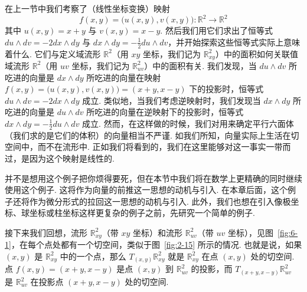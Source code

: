 在上一节中我们考察了（线性坐标变换）映射
\[
f(x,y)=\bigl(u(x,y),v(x,y)\bigr):\mathbb{R}^2\to\mathbb{R}^2
\]
其中 $u(x,y)=x+y$ 与 $v(x,y)=x-y$. 然后我们用它们求出了恒等式 $du\wedge dv=-2dx\wedge dy$ 与 $dx\wedge dy=-\frac12du\wedge dv$，并开始探索这些恒等式实际上意味着什么. 它们与定义域流形 $\mathbb{R}^2$（用 $xy$ 坐标，我们记为 $\mathbb{R}^2_{xy}$）中的面积如何关联值域流形 $\mathbb{R}^2$（用 $uv$ 坐标，我们记为 $\mathbb{R}^2_{uv}$）中的面积有关. 我们发现，当 $du\wedge dv$ 所吃进的向量是 $dx\wedge dy$ 所吃进的向量在映射 $f(x,y)=\bigl(u(x,y),v(x,y)\bigr)=(x+y,x-y)$ 下的投影时，恒等式 $du\wedge dv=-2dx\wedge dy$ 成立. 类似地，当我们考虑逆映射时，我们发现当 $dx\wedge dy$ 所吃进的向量是 $du\wedge dv$ 所吃进的向量在逆映射下的投影时，恒等式 $dx\wedge dy=-\frac12du\wedge dv$ 成立. 然而，在这样做的时候，我们对用来确定平行六面体（我们求的是它们的体积）的向量相当不严谨. 如我们所知，向量实际上生活在切空间中，而不在流形中. 正如我们将看到的，我们在这里能够对这一事实一带而过，是因为这个映射是线性的.

并不是想用这个例子把你烦得要死，但在本节中我们将在数学上更精确的同时继续使用这个例子. 这将作为向量的前推这一思想的动机与引入. 在本章后面，这个例子还将作为微分形式的拉回这一思想的动机与引入. 此外，我们也想在引入像极坐标、球坐标或柱坐标这样更复杂的例子之前，先研究一个简单的例子.

接下来我们回想，流形 $\mathbb{R}^2_{xy}$（带 $xy$ 坐标）和流形 $\mathbb{R}^2_{uv}$（带 $uv$ 坐标），见图~\ref{fig:6-1}，在每个点处都有一个切空间，类似于图~\ref{fig:2-15} 所示的情况. 也就是说，如果 $(x,y)$ 是 $\mathbb{R}^2_{xy}$ 中的一个点，那么 $T_{(x,y)}\mathbb{R}^2_{xy}$ 就是 $\mathbb{R}^2_{xy}$ 在点 $(x,y)$ 处的切空间. 点 $f(x,y)=(x+y,x-y)$ 是点 $(x,y)$ 到 $\mathbb{R}^2_{uv}$ 的投影，而 $T_{(x+y,x-y)}\mathbb{R}^2_{uv}$ 是 $\mathbb{R}^2_{uv}$ 在投影点 $(x+y,x-y)$ 处的切空间.

